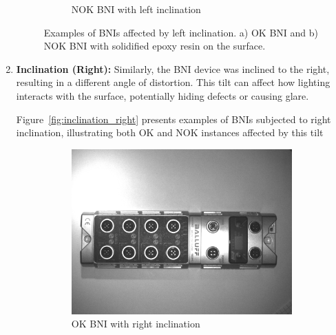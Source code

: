 \documentclass[12pt,DIV14,BCOR12mm,a4paper,footinclude=false,headinclude,parskip=half-,twoside,openright,cleardoublepage=empty,toc=index,bibliography=totoc,listof=totoc]{scrreprt}
\numberwithin{equation}{chapter}
\begin{document}
\begin{enumerate}
\begin{figure}
\begin{subfigure}[b]{0.45\textwidth}
            \caption{NOK BNI with left inclination}
        \end{subfigure}
        \caption{Examples of BNIs affected by left inclination. a) OK BNI and b) NOK BNI with solidified epoxy resin on the surface.}
        \label{fig:inclination_left}
    \end{figure}

    \item \textbf{Inclination (Right):} Similarly, the BNI device was inclined to the right, resulting in a different angle of distortion. This tilt can affect how lighting interacts with the surface, potentially hiding defects or causing glare.
    
	Figure~\ref{fig:inclination_right} presents examples of BNIs subjected to right inclination, illustrating both OK and NOK instances affected by this tilt
    \begin{figure}
        \centering
        \begin{subfigure}[b]{0.45\textwidth}
            \centering
            \includegraphics[scale=0.15]{../media/BNI-influence-right-OK.png}
            \caption{OK BNI with right inclination}
        \end{subfigure}
        \hfill
        \begin{subfigure}[b]{0.45\textwidth}
            \centering

\end{subfigure}
\end{figure}
\end{enumerate}
\end{document}
